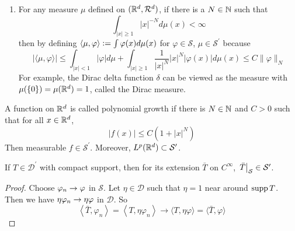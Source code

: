 \begin{enumerate}
\begin{exam}
\begin{enumerate}
			\item For any measure $\mu$ defined on $(\mathbb{R}^d,\mathcal{R}^d)$, if there is a $N \in \mathbb{N}$ such that
			\begin{equation*}
				\int_{|x| \geq 1}|x|^{-N} d \mu(x)<\infty
			\end{equation*}
			then by defining $\langle \mu,\varphi \rangle \vcentcolon= \int \varphi(x)d\mu(x)$ for $\varphi \in \mathcal{S}$, $\mu \in \mathcal{S}^\prime$ because
			\begin{equation*}
				|\langle\mu, \varphi\rangle| \leq \int_{|x|<1}|\varphi| d \mu+\int_{|x| \geq 1} \frac{1}{|x|^N}|x|^N|\varphi(x)| d \mu(x) \leq C\|\varphi\|_N
			\end{equation*}
			For example, the Dirac delta function $\delta$ can be viewed as the measure with $\mu(\left\{0\right\}) = \mu(\mathbb{R}^d) = 1$, called the Dirac measure.
		\end{enumerate}
	\end{exam}
	\begin{rmk}
		A function on $\mathbb{R}^d$ is called polynomial growth if there is $N \in \mathbb{N}$ and $C > 0$ such that for all $x \in \mathbb{R}^d$,
		\begin{equation*}
			|f(x)| \leq C\left(1+|x|^N\right)
		\end{equation*}
		Then measurable $f \in \mathcal{S}^\prime$. Moreover, $L^p(\mathbb{R}^d) \subset \mathcal{S}^\prime$.
	\end{rmk}

	\begin{prop}
		If $T \in \mathcal{D}^\prime$ with compact support, then for its extension $\bar{T}$ on $C^\infty$, $\left.\bar{T}\right\lvert_\mathcal{S} \in \mathcal{S}^\prime$.
	\end{prop}
	\begin{proof}
		Choose $\varphi_n \rightarrow \varphi$ in $\mathcal{S}$. Let $\eta \in \mathcal{D}$ such that $\eta = 1$ near around $\operatorname{supp} T$. Then we have $\eta \varphi_n \rightarrow \eta \varphi$ in $\mathcal{D}$. So
		\begin{equation*}
			\left\langle\bar{T}, \varphi_n\right\rangle=\left\langle T, \eta \varphi_n\right\rangle \rightarrow\langle T, \eta \varphi\rangle=\langle\bar{T}, \varphi\rangle
		\end{equation*}
	\end{proof}


\end{enumerate}
